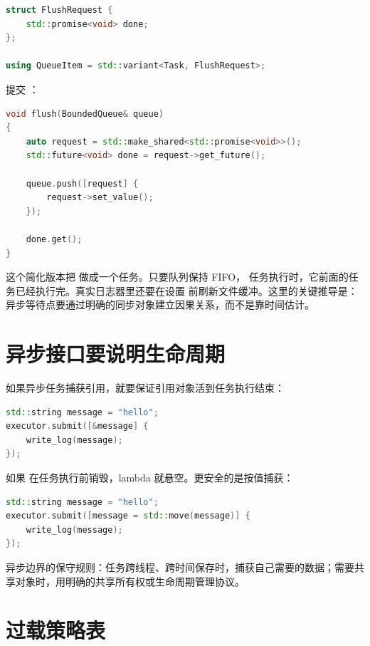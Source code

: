 \begin{lstlisting}[language=C++,caption={flush 消息的队列协议}]
struct FlushRequest {
    std::promise<void> done;
};

using QueueItem = std::variant<Task, FlushRequest>;
\end{lstlisting}

提交 ：

\begin{lstlisting}[language=C++,caption={提交 flush 并等待完成}]
void flush(BoundedQueue& queue)
{
    auto request = std::make_shared<std::promise<void>>();
    std::future<void> done = request->get_future();

    queue.push([request] {
        request->set_value();
    });

    done.get();
}
\end{lstlisting}

这个简化版本把  做成一个任务。只要队列保持 FIFO， 任务执行时，它前面的任务已经执行完。真实日志器里还要在设置  前刷新文件缓冲。这里的关键推导是：异步等待点要通过明确的同步对象建立因果关系，而不是靠时间估计。

\section{异步接口要说明生命周期}

如果异步任务捕获引用，就要保证引用对象活到任务执行结束：

\begin{lstlisting}[language=C++,caption={异步引用捕获风险}]
std::string message = "hello";
executor.submit([&message] {
    write_log(message);
});
\end{lstlisting}

如果  在任务执行前销毁，lambda 就悬空。更安全的是按值捕获：

\begin{lstlisting}[language=C++,caption={异步任务按值捕获数据}]
std::string message = "hello";
executor.submit([message = std::move(message)] {
    write_log(message);
});
\end{lstlisting}

异步边界的保守规则：任务跨线程、跨时间保存时，捕获自己需要的数据；需要共享对象时，用明确的共享所有权或生命周期管理协议。

\section{过载策略表}

